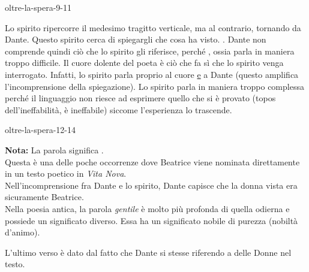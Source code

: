 \documentclass[preview]{standalone}
\begin{document}
\begin{snippet}{oltre-la-spera-9-11}

    Lo spirito ripercorre il medesimo tragitto verticale, ma al contrario, tornando da Dante.
    Questo spirito cerca di spiegargli che cosa ha visto.
    .
    Dante non comprende quindi ciò che lo spirito gli riferisce, perché
    , ossia parla in maniera troppo difficile.
    Il cuore dolente del poeta è ciò che fa sì che lo spirito venga interrogato.
    Infatti, lo spirito parla proprio al cuore \underline{e} a Dante (questo amplifica l'incomprensione della spiegazione).
    Lo spirito parla in maniera troppo complessa perché il linguaggio non riesce
    ad esprimere quello che si è provato (topos dell'ineffabilità, è ineffabile)
    siccome l'esperienza lo trascende.
\end{snippet}

\begin{snippet}{oltre-la-spera-12-14}

    \textbf{\color{red}Nota:} La parola  significa . \\
    Questa è una delle poche occorrenze dove Beatrice viene nominata direttamente in un testo poetico in \textit{Vita Nova}.\\
    Nell'incomprensione fra Dante e lo spirito, Dante capisce che la donna vista era sicuramente
    Beatrice. \\
    Nella poesia antica, la parola \textit{gentile} è molto più profonda di quella odierna
    e possiede un significato diverso. Essa ha un significato nobile di purezza (nobiltà d'animo).
    
    L'ultimo verso è dato dal fatto che Dante si stesse riferendo a delle Donne nel testo.
\end{snippet}
\end{document}
